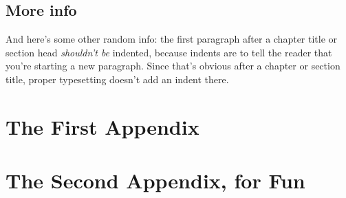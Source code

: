 \documentclass[12pt,twoside]{reedthesis}
\begin{document}
\section{More info}
And here's some other random info: the first paragraph after a chapter title or section head \emph{shouldn't be} indented, because indents are to tell the reader that you're starting a new paragraph. Since that's obvious after a chapter or section title, proper typesetting doesn't add an indent there.


    \appendix
      \chapter{The First Appendix}
      \chapter{The Second Appendix, for Fun}



  \backmatter %

    \nocite{*}


%  
 

\end{document}
